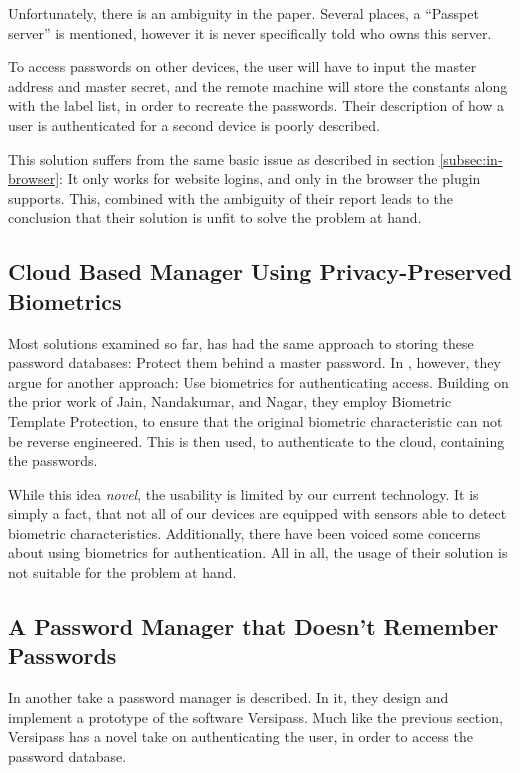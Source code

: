 			Unfortunately, there is an ambiguity in the paper. Several places, a ``Passpet server'' is mentioned, however it is never specifically told who owns this server. 

			To access passwords on other devices, the user will have to input the master address and master secret, and the remote machine will store the constants along with the label list, in order to recreate the passwords. Their description of how a user is authenticated for a second device is poorly described.

			This solution suffers from the same basic issue as described in section \ref{subsec:in-browser}: It only works for website logins, and only in the browser the plugin supports. This, combined with the ambiguity of their report leads to the conclusion that their solution is unfit to solve the problem at hand.

		\subsection*{Cloud Based Manager Using Privacy-Preserved Biometrics}
			Most solutions examined so far, has had the same approach to storing these password databases: Protect them behind a master password. In \cite{busch2014}, however, they argue for another approach: Use biometrics for authenticating access. Building on the prior work of Jain, Nandakumar, and Nagar, they employ Biometric Template Protection, to ensure that the original biometric characteristic can not be reverse engineered. This is then used, to authenticate to the cloud, containing the passwords.


			While this idea \emph{novel}, the usability is limited by our current technology. It is simply a fact, that not all of our devices are equipped with sensors able to detect biometric characteristics. Additionally, there have been voiced some concerns about using biometrics for authentication. All in all, the usage of their solution is not suitable for the problem at hand.

		\subsection*{A Password Manager that Doesn't Remember Passwords}
			In \cite{stobert2014} another take a password manager is described. In it, they design and implement a prototype of the software Versipass. Much like the previous section, Versipass has a novel take on authenticating the user, in order to access the password database.

